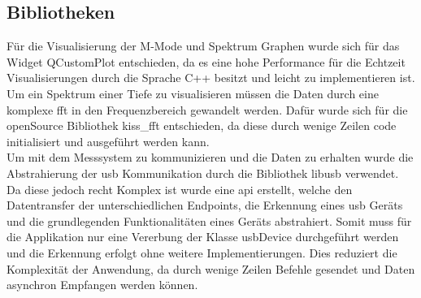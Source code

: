 \subsection{Bibliotheken}
Für die Visualisierung der M-Mode und Spektrum Graphen wurde sich für das Widget QCustomPlot\cite{QCustomPlot} entschieden, da es eine hohe Performance für die Echtzeit Visualisierungen durch die Sprache C++ besitzt und leicht zu implementieren ist.  Um ein Spektrum einer Tiefe zu visualisieren müssen die Daten durch eine komplexe \ac{fft} in den Frequenzbereich gewandelt werden. Dafür wurde sich für die openSource Bibliothek kiss\_fft\cite{kissfft} entschieden, da diese durch wenige Zeilen code initialisiert und ausgeführt werden kann.\\
Um mit dem Messsystem zu kommunizieren und die Daten zu erhalten wurde die Abstrahierung der \ac{usb} Kommunikation durch die Bibliothek libusb\cite{libusb} verwendet. Da diese jedoch recht Komplex ist wurde eine \ac{api} erstellt, welche den Datentransfer der unterschiedlichen Endpoints, die Erkennung eines \ac{usb} Geräts und die grundlegenden Funktionalitäten eines Geräts abstrahiert. Somit muss für die Applikation nur eine Vererbung der Klasse usbDevice durchgeführt werden und die Erkennung erfolgt ohne weitere Implementierungen. Dies reduziert die Komplexität der Anwendung, da durch wenige Zeilen Befehle gesendet und Daten asynchron Empfangen werden können.
